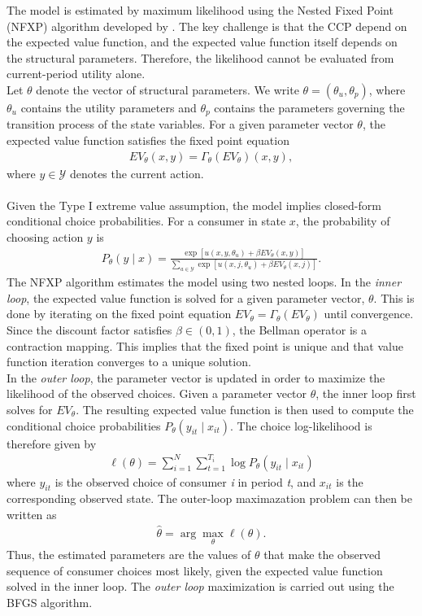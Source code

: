 The model is estimated by maximum likelihood using the Nested Fixed Point (NFXP) algorithm developed by \cite{Rust1987}. The key challenge is that the CCP depend on the expected value function, and the expected value function itself depends on the structural parameters. Therefore, the likelihood cannot be evaluated from current-period utility alone.
\\
Let $\theta$ denote the vector of structural parameters. We write $\theta=(\theta_u,\theta_p)$, where $\theta_u$ contains the utility parameters and $\theta_p$ contains the parameters governing the transition process of the state variables. For a given parameter vector $\theta$, the expected value function satisfies the fixed point equation
\begin{align*}
EV_\theta(x,y)
=
\Gamma_\theta(EV_\theta)(x,y),
\end{align*}
where $y \in \mathcal{Y}$ denotes the current action. 
\\
\\
Given the Type I extreme value assumption, the model implies closed-form conditional choice probabilities. For a consumer in state $x$, the probability of choosing action $y$ is
\begin{align*}
P_\theta(y \mid x)
=
\frac{
\exp\left[
u(x,y,\theta_u)+\beta EV_\theta(x,y)
\right]
}{
\sum_{a\in\mathcal{Y}}
\exp\left[
u(x,j,\theta_u)+\beta EV_\theta(x,j)
\right]
}.
\end{align*}
The NFXP algorithm estimates the model using two nested loops. In the \textit{inner loop}, the expected value function is solved for a given parameter vector, $\theta$. This is done by iterating on the fixed point equation $EV_\theta = \Gamma_\theta(EV_\theta)$
until convergence. Since the discount factor satisfies $\beta \in (0,1)$, the Bellman operator is a contraction mapping. This implies that the fixed point is unique and that value function iteration converges to a unique solution.
\\
In the \textit{outer loop}, the parameter vector is updated in order to maximize the likelihood of the observed choices. Given a parameter vector $\theta$, the inner loop first solves for $EV_\theta$. The resulting expected value function is then used to compute the conditional choice probabilities $P_\theta(y_{it}\mid x_{it})$. The choice log-likelihood is therefore given by
\begin{align*}
    \ell(\theta)
=
\sum_{i=1}^{N}
\sum_{t=1}^{T_i}
\log P_\theta(y_{it}\mid x_{it})
\end{align*}
where $y_{it}$ is the observed choice of consumer \textit{i} in period \textit{t}, and $x_{it}$ is the corresponding observed state. The outer-loop maximazation problem can then be written as
\begin{align*}
\hat{\theta}
=
\arg\max_{\theta}
\ell(\theta).
\end{align*}
Thus, the estimated parameters are the values of $\theta$ that make the observed sequence of consumer choices most likely, given the expected value function solved in the inner loop. The \textit{outer loop} maximization is carried out using the BFGS algorithm.  

